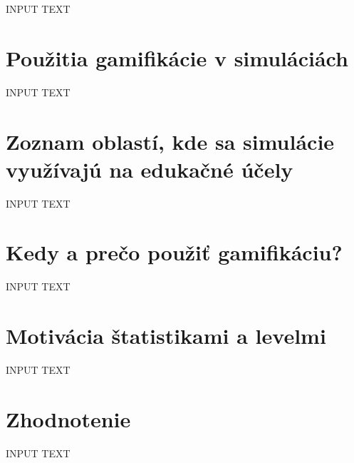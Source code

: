 \documentclass[10pt,slovak,a4paper]{article}
\begin{document}
INPUT TEXT 

\section{Použitia gamifikácie v simuláciách} \label{Uses}

INPUT TEXT

\section{Zoznam oblastí, kde sa simulácie využívajú na edukačné účely} \label{List}

INPUT TEXT

\section{Kedy a prečo použiť gamifikáciu?} \label{Reason}

INPUT TEXT

\section{Motivácia štatistikami a levelmi} \label{Motivation}

INPUT TEXT

\section{Zhodnotenie} \label{Evaluation}

INPUT TEXT

%
%
\end{document}
